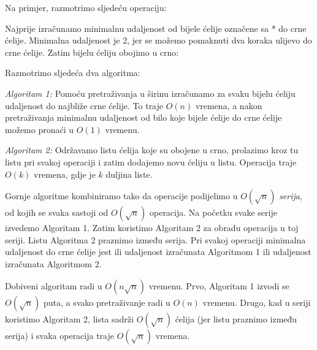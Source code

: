 Na primjer, razmotrimo sljedeću operaciju:

\begin{center}
\end{center}

Najprije izračunamo minimalnu udaljenost
od bijele ćelije označene sa * do crne ćelije.
Minimalna udaljenost je 2, jer se možemo pomaknuti
dva koraka ulijevo do crne ćelije.
Zatim bijelu ćeliju obojimo u crno:

\begin{center}
\end{center}

Razmotrimo sljedeća dva algoritma:

\emph{Algoritam 1:} Pomoću pretraživanja u širinu
izračunamo
za svaku bijelu ćeliju udaljenost do najbliže crne ćelije.
To traje $O(n)$ vremena, a nakon pretraživanja
minimalnu udaljenost od bilo koje bijele ćelije
do crne ćelije možemo pronaći u $O(1)$ vremenu.

\emph{Algoritam 2:} Održavamo listu ćelija koje su
obojene u crno, prolazimo kroz tu listu pri svakoj operaciji
i zatim dodajemo novu ćeliju u listu.
Operacija traje $O(k)$ vremena, gdje je $k$ duljina liste.

Gornje algoritme kombiniramo tako da
operacije podijelimo u
$O(\sqrt n)$ \emph{serija}, od kojih se svaka sastoji
od $O(\sqrt n)$ operacija.
Na početku svake serije
izvedemo Algoritam 1.
Zatim koristimo Algoritam 2 za obradu operacija
u toj seriji.
Listu Algoritma 2 praznimo između
serija.
Pri svakoj operaciji
minimalna udaljenost do crne ćelije
jest ili udaljenost izračunata Algoritmom 1
ili udaljenost izračunata Algoritmom 2.

Dobiveni algoritam radi u
$O(n \sqrt n)$ vremenu.
Prvo, Algoritam 1 izvodi se $O(\sqrt n)$ puta,
a svako pretraživanje radi u $O(n)$ vremenu.
Drugo, kad u seriji koristimo Algoritam 2,
lista sadrži $O(\sqrt n)$ ćelija
(jer listu praznimo između serija)
i svaka operacija traje $O(\sqrt n)$ vremena.

